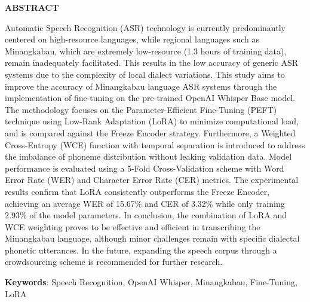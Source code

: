 \clearpage
{}%
\thispagestyle{fancy}

\begin{center}
	\large \bfseries \MakeUppercase{Abstract}\\
	\bigskip
	
	\normalsize \normalfont \justifying \singlespacing
	Automatic Speech Recognition (ASR) technology is currently predominantly centered on high-resource languages, while regional languages such as Minangkabau, which are extremely low-resource (1.3 hours of training data), remain inadequately facilitated. This results in the low accuracy of generic ASR systems due to the complexity of local dialect variations. This study aims to improve the accuracy of Minangkabau language ASR systems through the implementation of fine-tuning on the pre-trained OpenAI Whisper Base model. The methodology focuses on the Parameter-Efficient Fine-Tuning (PEFT) technique using Low-Rank Adaptation (LoRA) to minimize computational load, and is compared against the Freeze Encoder strategy. Furthermore, a Weighted Cross-Entropy (WCE) function with temporal separation is introduced to address the imbalance of phoneme distribution without leaking validation data. Model performance is evaluated using a 5-Fold Cross-Validation scheme with Word Error Rate (WER) and Character Error Rate (CER) metrics. The experimental results confirm that LoRA consistently outperforms the Freeze Encoder, achieving an average WER of 15.67\% and CER of 3.32\% while only training 2.93\% of the model parameters. In conclusion, the combination of LoRA and WCE weighting proves to be effective and efficient in transcribing the Minangkabau language, although minor challenges remain with specific dialectal phonetic utterances. In the future, expanding the speech corpus through a crowdsourcing scheme is recommended for further research.\par

    \vspace{20pt}
	\raggedright \textbf{Keywords}: Speech Recognition, OpenAI Whisper, Minangkabau, Fine-Tuning, LoRA
    
	\vfill
	
\end{center}
\clearpage